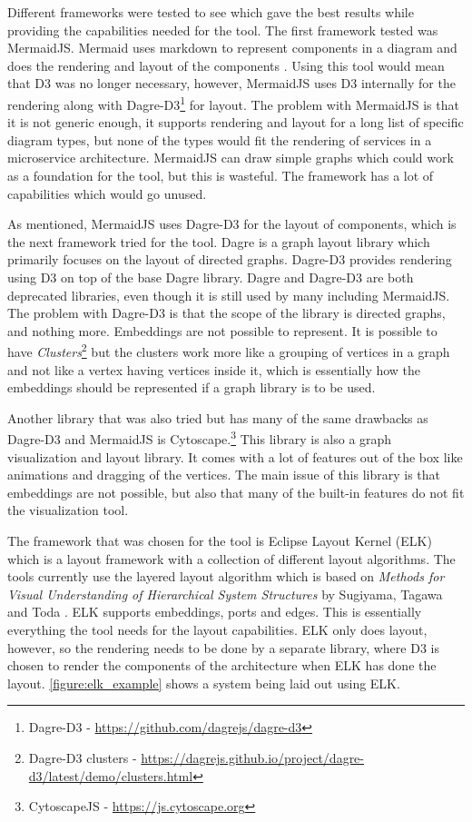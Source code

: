 Different frameworks were tested to see which gave the best results while providing the capabilities needed for the tool.
The first framework tested was MermaidJS. Mermaid uses markdown to represent components in a diagram and does the rendering and layout of the components \cite{mermaid}. Using this tool would mean that D3 was no longer necessary, however, MermaidJS uses D3 internally for the rendering along with Dagre-D3\footnote{Dagre-D3 - \url{https://github.com/dagrejs/dagre-d3}} for layout.
The problem with MermaidJS is that it is not generic enough, it supports rendering and layout for a long list of specific diagram types, but none of the types would fit the rendering of services in a microservice architecture.
MermaidJS can draw simple graphs which could work as a foundation for the tool, but this is wasteful. The framework has a lot of capabilities which would go unused.

As mentioned, MermaidJS uses Dagre-D3 for the layout of components, which is the next framework tried for the tool.
Dagre is a graph layout library which primarily focuses on the layout of directed graphs. Dagre-D3 provides rendering using D3 on top of the base Dagre library.
Dagre and Dagre-D3 are both deprecated libraries, even though it is still used by many including MermaidJS.
The problem with Dagre-D3 is that the scope of the library is directed graphs, and nothing more.
Embeddings are not possible to represent.
It is possible to have \emph{Clusters}\footnote{Dagre-D3 clusters - \url{https://dagrejs.github.io/project/dagre-d3/latest/demo/clusters.html}}
but the clusters work more like a grouping of vertices in a graph and not like a vertex having vertices inside it, which is essentially how the embeddings should be represented if a graph library is to be used.

Another library that was also tried but has many of the same drawbacks as Dagre-D3 and MermaidJS is Cytoscape.\footnote{CytoscapeJS - \url{https://js.cytoscape.org}}
This library is also a graph visualization and layout library. It comes with a lot of features out of the box like animations and dragging of the vertices. The main issue of this library is that embeddings are
not possible, but also that many of the built-in features do not fit the visualization tool.

The framework that was chosen for the tool is Eclipse Layout Kernel (ELK) \cite{ELK}
which is a layout framework with a collection of different layout algorithms. The tools currently use the layered layout algorithm which is based on \emph{Methods for Visual Understanding of Hierarchical System Structures} by Sugiyama, Tagawa and Toda \cite{4308636}. ELK supports embeddings, ports and edges. This is essentially everything the tool needs for the layout capabilities.
ELK only does layout, however, so the rendering needs to be done by a separate library, where D3 is chosen to render the components of the architecture when ELK has done the layout.
\cref{figure:elk_example} shows a system being laid out using ELK.

